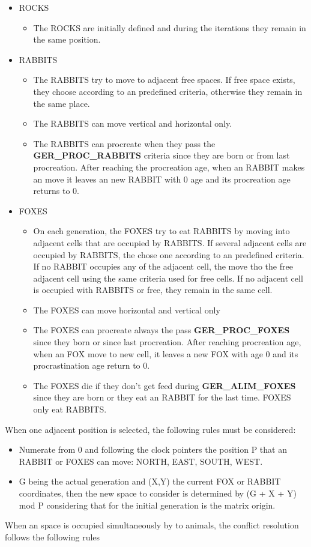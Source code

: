 \documentclass[10pt,a4paper,final]{report}
\begin{document}
\begin{itemize}
\item ROCKS
	\begin{itemize}
 	\item The ROCKS are initially defined and during the iterations they remain in the same position.
	\end{itemize}
\item RABBITS
	\begin{itemize}
	\item The RABBITS try to move to adjacent free spaces. If free space exists, they choose according to an predefined criteria, otherwise they remain in the same place.
	\item The RABBITS can move vertical and horizontal only.
	\item The RABBITS can procreate when they pass the \textbf{GER\_PROC\_RABBITS} criteria since they are born or from last procreation. After reaching the procreation age, when an RABBIT makes an move it leaves an new RABBIT with 0 age and its procreation age returns to 0.
	\end{itemize}	
\item FOXES
	\begin{itemize}
	\item On each generation, the FOXES try to eat RABBITS by moving into adjacent cells that are occupied by RABBITS. If several adjacent cells are occupied by RABBITS, the chose one according to an predefined criteria. If no RABBIT occupies any of the adjacent cell, the move tho the free adjacent cell using the same criteria used for free cells. If no adjacent cell is occupied with RABBITS or free, they remain in the same cell.
	\item The FOXES can move horizontal and vertical only
	\item The FOXES can procreate always the pass \textbf{GER\_PROC\_FOXES} since they born or since last procreation. After reaching procreation age, when an FOX move to new cell, it leaves a new FOX with age 0 and its procrastination age return to 0.
	\item The FOXES die if they don't get feed during \textbf{GER\_ALIM\_FOXES} since they are born or they eat an RABBIT for the last time. FOXES only eat RABBITS.
	\end{itemize}
\end{itemize}
\bigskip
When one adjacent position is selected, the following rules must be considered:

\begin{itemize}
\item Numerate from 0 and following the clock pointers the position P that an RABBIT or FOXES can move: NORTH, EAST, SOUTH, WEST.
\item G being the actual generation and (X,Y) the current FOX or RABBIT coordinates, then the new space to consider is determined by (G + X + Y) mod P considering that for the initial generation is the matrix origin. 
\end{itemize}
When an space is occupied simultaneously by to animals, the conflict resolution follows the following rules
\end{document}
